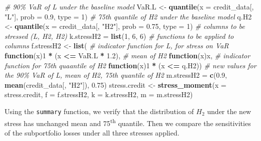 \documentclass[
]{article}
\newenvironment{Shaded}{\begin{snugshade}}{\end{snugshade}}
\newcommand{\CommentTok}[1]{\textcolor[rgb]{0.56,0.35,0.01}{\textit{#1}}}
\newcommand{\ControlFlowTok}[1]{\textcolor[rgb]{0.13,0.29,0.53}{\textbf{#1}}}
\newcommand{\DataTypeTok}[1]{\textcolor[rgb]{0.13,0.29,0.53}{#1}}
\newcommand{\DecValTok}[1]{\textcolor[rgb]{0.00,0.00,0.81}{#1}}
\newcommand{\FloatTok}[1]{\textcolor[rgb]{0.00,0.00,0.81}{#1}}
\newcommand{\KeywordTok}[1]{\textcolor[rgb]{0.13,0.29,0.53}{\textbf{#1}}}
\newcommand{\NormalTok}[1]{#1}
\newcommand{\OperatorTok}[1]{\textcolor[rgb]{0.81,0.36,0.00}{\textbf{#1}}}
\newcommand{\StringTok}[1]{\textcolor[rgb]{0.31,0.60,0.02}{#1}}
\begin{document}
\begin{Shaded}
\begin{Highlighting}[]
\CommentTok{\# 90\% VaR of L under the baseline model}
\NormalTok{VaR.L \textless{}{-}}\StringTok{ }\KeywordTok{quantile}\NormalTok{(}\DataTypeTok{x =}\NormalTok{ credit\_data[, }\StringTok{"L"}\NormalTok{], }\DataTypeTok{prob =} \FloatTok{0.9}\NormalTok{, }\DataTypeTok{type =} \DecValTok{1}\NormalTok{) }
\CommentTok{\# 75th quantile of H2 under the baseline model}
\NormalTok{q.H2 \textless{}{-}}\StringTok{ }\KeywordTok{quantile}\NormalTok{(}\DataTypeTok{x =}\NormalTok{ credit\_data[, }\StringTok{"H2"}\NormalTok{], }\DataTypeTok{prob =} \FloatTok{0.75}\NormalTok{, }\DataTypeTok{type =} \DecValTok{1}\NormalTok{) }
\CommentTok{\# columns to be stressed (L, H2, H2)}
\NormalTok{k.stressH2 =}\StringTok{ }\KeywordTok{list}\NormalTok{(}\DecValTok{1}\NormalTok{, }\DecValTok{6}\NormalTok{, }\DecValTok{6}\NormalTok{) }
\CommentTok{\# functions to be applied to columns}
\NormalTok{f.stressH2 \textless{}{-}}\StringTok{ }\KeywordTok{list}\NormalTok{(}
                 \CommentTok{\# indicator function for L, for stress on VaR}
                 \ControlFlowTok{function}\NormalTok{(x)}\DecValTok{1} \OperatorTok{*}\StringTok{ }\NormalTok{(x }\OperatorTok{\textless{}=}\StringTok{ }\NormalTok{VaR.L }\OperatorTok{*}\StringTok{ }\FloatTok{1.2}\NormalTok{), }
                 \CommentTok{\# mean of H2}
                 \ControlFlowTok{function}\NormalTok{(x)x, }
                 \CommentTok{\# indicator function for 75th quaantile of H2}
                 \ControlFlowTok{function}\NormalTok{(x)}\DecValTok{1} \OperatorTok{*}\StringTok{ }\NormalTok{(x }\OperatorTok{\textless{}=}\StringTok{ }\NormalTok{q.H2)) }
\CommentTok{\# new values for the 90\% VaR of L, mean of H2, 75th quantile of H2}
\NormalTok{m.stressH2 =}\StringTok{ }\KeywordTok{c}\NormalTok{(}\FloatTok{0.9}\NormalTok{, }\KeywordTok{mean}\NormalTok{(credit\_data[, }\StringTok{"H2"}\NormalTok{]), }\FloatTok{0.75}\NormalTok{) }
\NormalTok{stress.credit \textless{}{-}}\StringTok{ }\KeywordTok{stress\_moment}\NormalTok{(}\DataTypeTok{x =}\NormalTok{ stress.credit, }\DataTypeTok{f =}\NormalTok{ f.stressH2, }\DataTypeTok{k =}\NormalTok{ k.stressH2, }
                               \DataTypeTok{m =}\NormalTok{ m.stressH2)}
\end{Highlighting}
\end{Shaded}

Using the \texttt{summary} function, we verify that the distribution of \(H_2\) under the new stress has unchanged mean and 75\textsuperscript{th} quantile. Then we compare the sensitivities of the subportfolio losses under all three stresses applied.
\end{document}
